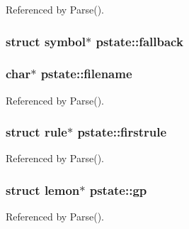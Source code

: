 Referenced by Parse().

\hypertarget{structpstate_aa7c42e4ccf94270f715b099fc85fe4b8}{
\subsubsection[{fallback}]{\setlength{\rightskip}{0pt plus 5cm}struct {\bf symbol}$\ast$ pstate\-::fallback}}\label{structpstate_aa7c42e4ccf94270f715b099fc85fe4b8}
\hypertarget{structpstate_a3046972c535a60e0b5ef0be08bddc3b0}{
\subsubsection[{filename}]{\setlength{\rightskip}{0pt plus 5cm}char$\ast$ pstate\-::filename}}\label{structpstate_a3046972c535a60e0b5ef0be08bddc3b0}


Referenced by Parse().

\hypertarget{structpstate_aa9807a90d93a3e1777609df2d01fa9dc}{
\subsubsection[{firstrule}]{\setlength{\rightskip}{0pt plus 5cm}struct {\bf rule}$\ast$ pstate\-::firstrule}}\label{structpstate_aa9807a90d93a3e1777609df2d01fa9dc}


Referenced by Parse().

\hypertarget{structpstate_a0fdae87f13f8df612a9ba09f6ec3b789}{
\subsubsection[{gp}]{\setlength{\rightskip}{0pt plus 5cm}struct {\bf lemon}$\ast$ pstate\-::gp}}\label{structpstate_a0fdae87f13f8df612a9ba09f6ec3b789}


Referenced by Parse().

